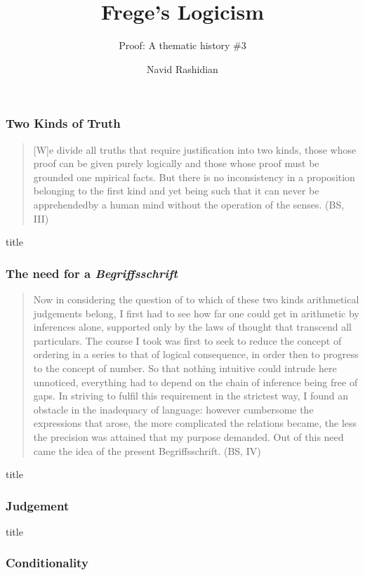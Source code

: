 \documentclass[compress,12pt]{beamer}
\title{Frege's Logicism}
\subtitle{Proof: A thematic history \#3}
\date{}
\author{Navid Rashidian}
\institute{University of Tehran}
\begin{document}
\frame[plain]{\titlepage}


\begin{frame}
    \frametitle{Two Kinds of Truth}
    \begin{quote}
        [W]e divide all truths that require justification into two kinds, those whose proof can be given purely logically and those whose proof must be grounded one mpirical facts. But there is no inconsistency in a proposition belonging to the first kind and yet being such that it can never be apprehendedby a human mind without the operation of the senses. (BS, III)
    \end{quote}
\end{frame}

\begin{frame}{title}
    \frametitle{The need for a \emph{Begriffsschrift}}
    \begin{quote}
        Now in considering the question of to which of these two kinds arithmetical judgements belong, I first had to see how far one could get in arithmetic by inferences alone, supported only by the laws of thought that transcend all particulars. The course I took was first to seek to reduce the concept of ordering in a series to that of logical consequence, in order then to progress to the concept of number. So that nothing intuitive could intrude here unnoticed, everything had to depend on the chain of inference being free of gaps. In striving to fulfil this requirement in the strictest way, I found an obstacle in the inadequacy of language: however cumbersome the expressions that arose, the more complicated the relations became, the less the precision was attained that my purpose demanded. Out of this need came the idea of the present \textup{Begriffsschrift}. (BS, IV)
    \end{quote}
\end{frame}

\begin{frame}{title}
    \frametitle{Judgement}
    \begin{quote}
        
    \end{quote}
\end{frame}

\begin{frame}{title}
    \frametitle{Conditionality}
    \begin{quote}
        
    \end{quote}
\end{frame}
\end{document}
